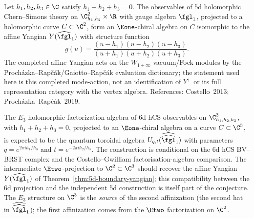 \begin{theorem}[Boundary chiral algebra at \texorpdfstring{$d = 5$}{d = 5}: the affine Yangian]
\label{thm:5d-boundary-yangian}
Let $h_1, h_2, h_3 \in \C$ satisfy $h_1 + h_2 + h_3 = 0$. The observables of 5d holomorphic Chern--Simons theory on $\C^2_{h_1, h_2} \times \R$ with gauge algebra $\fgl_1$, projected to a holomorphic curve $C \subset \C^2$, form an $\Eone$-chiral algebra on $C$ isomorphic to the affine Yangian $Y(\widehat{\fgl}_1)$ with structure function
\[
 g(u) = \frac{(u - h_1)(u - h_2)(u - h_3)}{(u + h_1)(u + h_2)(u + h_3)}.
\]
The completed affine Yangian acts on the $W_{1+\infty}$ vacuum/Fock
modules by the Proch\'azka--Rap\v{c}\'ak/Gaiotto--Rap\v{c}\'ak
evaluation dictionary; the statement used here is this completed
mode-action, not an identification of $Y^+$ or its full representation
category with the vertex algebra. References: Costello~2013;
Proch\'azka--Rap\v{c}\'ak~2019.
\end{theorem}

\begin{conjecture}[Boundary chiral algebra at \texorpdfstring{$d = 6$}{d = 6}: quantum toroidal from factorization]
\label{conj:6d-boundary-toroidal}
\ClaimStatusConjectured
The $E_3$-holomorphic factorization algebra of 6d hCS observables on
$\C^3_{h_1,h_2,h_3}$, with $h_1+h_2+h_3=0$, projected to an
$\Eone$-chiral algebra on a curve $C\subset\C^3$, is expected to be the
quantum toroidal algebra $U_{q,t}(\widehat{\widehat{\fgl}}_1)$ with
parameters $q=e^{2\pi i h_1/h_3}$ and $t=e^{-2\pi i h_2/h_3}$. The
construction is conditional on the 6d hCS BV--BRST complex and the
Costello--Gwilliam factorisation-algebra comparison. The intermediate
$\Etwo$-projection to $\C^2 \subset \C^3$
should recover the affine Yangian $Y(\widehat{\fgl}_1)$ of
Theorem~\ref{thm:5d-boundary-yangian}; this compatibility between the 6d
projection and the independent 5d construction is itself part of the
conjecture. The $E_3$ structure on $\C^3$ is the \emph{source} of the
second affinization (the second hat in $\widehat{\widehat{\fgl}}_1$); the
first affinization comes from the $\Etwo$ factorization on $\C^2$.
\end{conjecture}

